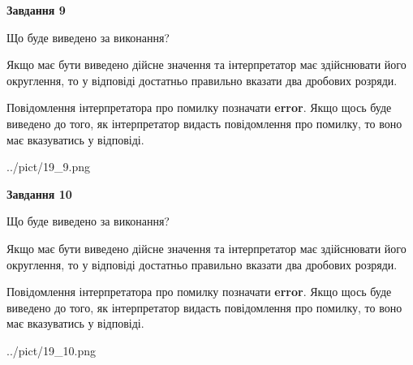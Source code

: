 \documentclass[12pt, ukrainian]{article}
\begin{document}
{\begin {Large}
{\begin {center}\textbf{Завдання 9}\end {center}}\par
Що буде виведено за виконання? \par

Якщо має бути виведено дійсне значення та інтерпретатор має здійснювати його округлення, 
то у відповіді достатньо правильно вказати два дробових розряди.

Повідомлення інтерпретатора про помилку позначати \textbf{error}.
Якщо щось буде виведено до того, як інтерпретатор видасть повідомлення про помилку, 
то воно має вказуватись у відповіді. \par

\begin{center}
	{../pict/19_9.png}
\end{center}
\newpage

{\begin {center}\textbf{Завдання 10}\end {center}}\par
Що буде виведено за виконання? \par

Якщо має бути виведено дійсне значення та інтерпретатор має здійснювати його округлення, 
то у відповіді достатньо правильно вказати два дробових розряди.

Повідомлення інтерпретатора про помилку позначати \textbf{error}.
Якщо щось буде виведено до того, як інтерпретатор видасть повідомлення про помилку, 
то воно має вказуватись у відповіді. \par

\begin{center}
	{../pict/19_10.png}
\end{center}
\newpage

\end {Large}}
\end{document}
